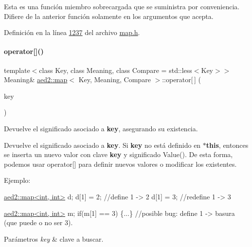 Esta es una función miembro sobrecargada que se suministra por conveniencia. Difiere de la anterior función solamente en los argumentos que acepta. 

Definición en la línea \hyperlink{map_8h_source_l01237}{1237} del archivo \hyperlink{map_8h_source}{map.\+h}.

\mbox{\label{classaed2_1_1map_a96f23896164ab47bee48c26b803f9801_a96f23896164ab47bee48c26b803f9801}} 
\paragraph{\texorpdfstring{operator[]()}{operator[]()}}
{\footnotesize\ttfamily template$<$class Key, class Meaning, class Compare = std\+::less$<$\+Key$>$$>$ \\
Meaning\& \hyperlink{classaed2_1_1map}{aed2\+::map}$<$ Key, Meaning, Compare $>$\+::operator\mbox{[}$\,$\mbox{]} (\begin{DoxyParamCaption}\item[{const Key \&}]{key }\end{DoxyParamCaption})\hspace{0.3cm}{\ttfamily [inline]}}



Devuelve el significado asociado a {\bfseries key}, asegurando su existencia. 

Devuelve el significado asociado a {\bfseries key}. Si {\bfseries key} no está definido en {\bfseries $\ast$this}, entonces se inserta un nuevo valor con clave {\bfseries key} y significado Value(). De esta forma, podemos usar {\ttfamily operator\mbox{[}\mbox{]}} para definir nuevos valores o modificar los existentes.

Ejemplo\+: 
\begin{DoxyCode}
\hyperlink{classaed2_1_1map}{aed2::map<int, int>} d;
d[1] = 2;      \textcolor{comment}{//define 1 -> 2}
d[1] = 3;      \textcolor{comment}{//redefine 1 -> 3}

\hyperlink{classaed2_1_1map}{aed2::map<int, int>} m;
\textcolor{keywordflow}{if}(m[1] == 3) \{...\} \textcolor{comment}{//posible bug: define 1 -> basura (que puede o no ser}
3).
\end{DoxyCode}



\begin{DoxyParams}{Parámetros}
{\em key} & clave a buscar. \\
\hline
\end{DoxyParams}

